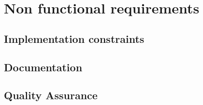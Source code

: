 \section{Non functional requirements}


\subsection{Implementation constraints}

\subsection{Documentation}

\subsection{Quality Assurance}